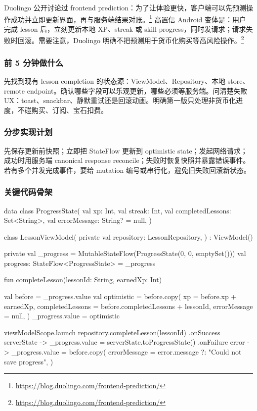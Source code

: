 Duolingo 公开讨论过 frontend prediction：为了让体验更快，客户端可以先预测操作成功并立即更新界面，再与服务端结果对账。\srcinferred\footnote{\url{https://blog.duolingo.com/frontend-prediction/}} 高置信 Android 变体是：用户完成 lesson 后，立刻更新本地 XP、streak 或 skill progress，同时发请求；请求失败时回滚。需要注意，Duolingo 明确不把预测用于货币化购买等高风险操作。\srcinferred\footnote{\url{https://blog.duolingo.com/frontend-prediction/}}

\subsubsection*{前 5 分钟做什么}

先找到现有 lesson completion 的状态源：ViewModel、Repository、本地 store、remote endpoint。确认哪些字段可以乐观更新，哪些必须等服务端。问清楚失败 UX：toast、snackbar、静默重试还是回滚动画。明确第一版只处理非货币化进度，不碰购买、订阅、宝石扣费。

\subsubsection*{分步实现计划}

先保存更新前快照；立即把 StateFlow 更新到 optimistic state；发起网络请求；成功时用服务端 canonical response reconcile；失败时恢复快照并暴露错误事件。若有多个并发完成事件，要给 mutation 编号或串行化，避免旧失败回滚新状态。

\subsubsection*{关键代码骨架}

\begin{kotlin}
data class ProgressState(
    val xp: Int,
    val streak: Int,
    val completedLessons: Set<String>,
    val errorMessage: String? = null,
)

class LessonViewModel(
    private val repository: LessonRepository,
) : ViewModel() {
    private val _progress = MutableStateFlow(ProgressState(0, 0, emptySet()))
    val progress: StateFlow<ProgressState> = _progress

    fun completeLesson(lessonId: String, earnedXp: Int) {
        val before = _progress.value
        val optimistic = before.copy(
            xp = before.xp + earnedXp,
            completedLessons = before.completedLessons + lessonId,
            errorMessage = null,
        )
        _progress.value = optimistic

        viewModelScope.launch {
            repository.completeLesson(lessonId)
                .onSuccess { serverState -> _progress.value = serverState.toProgressState() }
                .onFailure { error ->
                    _progress.value = before.copy(
                        errorMessage = error.message ?: "Could not save progress",
                    )
                }
        }
    }
}
\end{kotlin}

